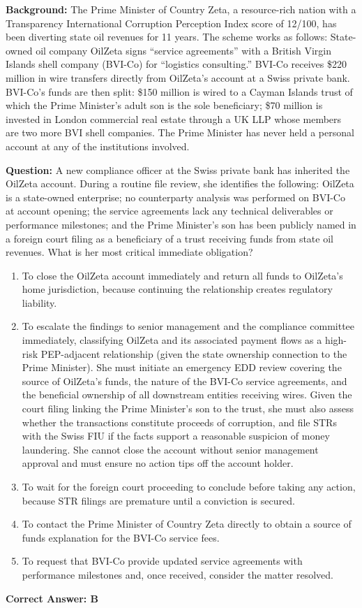 \documentclass[11pt,a4paper]{article}
\begin{document}
	\textbf{Background:} The Prime Minister of Country Zeta, a resource-rich nation with a Transparency International Corruption Perception Index score of 12/100, has been diverting state oil revenues for 11 years. The scheme works as follows: State-owned oil company OilZeta signs ``service agreements'' with a British Virgin Islands shell company (BVI-Co) for ``logistics consulting.'' BVI-Co receives \$220 million in wire transfers directly from OilZeta's account at a Swiss private bank. BVI-Co's funds are then split: \$150 million is wired to a Cayman Islands trust of which the Prime Minister's adult son is the sole beneficiary; \$70 million is invested in London commercial real estate through a UK LLP whose members are two more BVI shell companies. The Prime Minister has never held a personal account at any of the institutions involved.
	
	\textbf{Question:} A new compliance officer at the Swiss private bank has inherited the OilZeta account. During a routine file review, she identifies the following: OilZeta is a state-owned enterprise; no counterparty analysis was performed on BVI-Co at account opening; the service agreements lack any technical deliverables or performance milestones; and the Prime Minister's son has been publicly named in a foreign court filing as a beneficiary of a trust receiving funds from state oil revenues. What is her most critical immediate obligation?
	
	\begin{enumerate}[label=\Alph*.]
		\item To close the OilZeta account immediately and return all funds to OilZeta's home jurisdiction, because continuing the relationship creates regulatory liability.
		\item To escalate the findings to senior management and the compliance committee immediately, classifying OilZeta and its associated payment flows as a high-risk PEP-adjacent relationship (given the state ownership connection to the Prime Minister). She must initiate an emergency EDD review covering the source of OilZeta's funds, the nature of the BVI-Co service agreements, and the beneficial ownership of all downstream entities receiving wires. Given the court filing linking the Prime Minister's son to the trust, she must also assess whether the transactions constitute proceeds of corruption, and file STRs with the Swiss FIU if the facts support a reasonable suspicion of money laundering. She cannot close the account without senior management approval and must ensure no action tips off the account holder.
		\item To wait for the foreign court proceeding to conclude before taking any action, because STR filings are premature until a conviction is secured.
		\item To contact the Prime Minister of Country Zeta directly to obtain a source of funds explanation for the BVI-Co service fees.
		\item To request that BVI-Co provide updated service agreements with performance milestones and, once received, consider the matter resolved.
	\end{enumerate}
	\textbf{Correct Answer: B}
	
\end{document}
